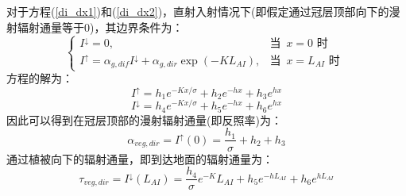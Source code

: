 对于方程(\ref{di_dx1})和(\ref{di_dx2})，直射入射情况下(即假定通过冠层顶部向下的漫射辐射通量等于0)，其边界条件为：
\begin{equation}
\begin{cases}
I^{\downarrow} =0, &\text {当 }\, x=0 \text { 时 } \\
I^{\uparrow} =\alpha_{g, dif} I^{\downarrow}+\alpha_{g, dir} \exp \left(-K L_{AI} \right), &\text {当 }\, x=L_{AI} \text { 时 }
\end{cases}
\end{equation}
方程的解为：
\begin{equation}
I^{\uparrow}=h_{1} e^{-K x / \sigma}+h_{2} e^{-h x}+h_{3} e^{h x}
\end{equation}
%
\begin{equation}
I^{\downarrow}=h_{4} e^{-K x / \sigma}+h_{5} e^{-h x}+h_{6} e^{h x}
\end{equation}
因此可以得到在冠层顶部的漫射辐射通量(即反照率)为：
\begin{equation}
\alpha_{veg, dir}=I^{\uparrow}(0)=\frac{h_{1}}{\sigma}+h_{2}+h_{3}
\end{equation}
通过植被向下的辐射通量，即到达地面的辐射通量为：
\begin{equation}
\tau_{veg, dir}=I^{\downarrow}\left(L_{A I}\right)=\frac{h_{4}}{\sigma} e^{-K} L_{A I}+h_{5} e^{-h L_{A I}}+h_{6} e^{h L_{A I}}
\end{equation}

